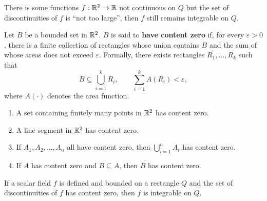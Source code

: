 \begin{remarkenv}
    There is some functions $f:\mathbb{R}^2 \to \mathbb{R}$ not continuous on $Q$ but the set of discontinuities of $f$ is ``not too large'', then $f$ still remains integrable on $Q$. 
\end{remarkenv}
\begin{definitionenv}
    Let $B$ be a bounded set in $\mathbb{R}^2$. $B$ is said to \textbf{have content zero} if, for every $\varepsilon >0$, there is a finite collection of rectangles whose union contains $B$ and the sum of whose areas does not exceed $\varepsilon$. Formally, there exists rectangles $R_1, \ldots, R_k$ such that
    $$
    B\subseteq \bigcup_{i=1}^k R_i, \qquad \sum_{i=1}^k A(R_i) < \varepsilon,
    $$
    where $A(\cdot)$ denotes the area function.
\end{definitionenv}
\begin{exampleenv}
    \begin{enumerate}
        \item A set containing finitely many points in $\mathbb{R}^2$ has content zero.
        \item A line segment in $\mathbb{R}^2$ has content zero.
        \item If $A_1, A_2, \ldots, A_n$ all have content zero, then $\displaystyle \bigcup_{i=1}^n A_i$ has content zero.
        \item If $A$ has content zero and $B \subseteq A$, then $B$ has content zero.
    \end{enumerate}
\end{exampleenv}
\begin{theoremenv}
    If a scalar field $f$ is defined and bounded on a rectangle $Q$ and the set of discontinuities of $f$ has content zero, then $f$ is integrable on $Q$.
\end{theoremenv}
